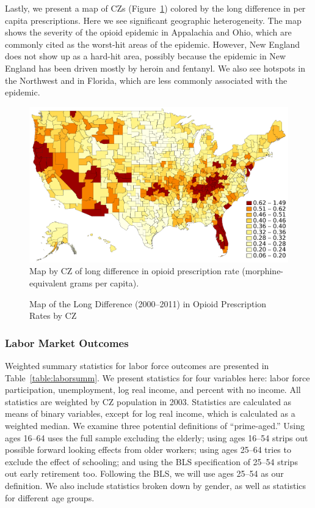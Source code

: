 \documentclass[12pt]{article}
\begin{document}
Lastly, we present a map of CZs (Figure~\ref{figure:opioidmap}) colored by the long difference in per capita prescriptions.  Here we see significant geographic heterogeneity.  The map shows the severity of the opioid epidemic in Appalachia and Ohio, which are commonly cited as the worst-hit areas of the epidemic.  However, New England does not show up as a hard-hit area, possibly because the epidemic in New England has been driven mostly by heroin and fentanyl.  We also see hotspots in the Northwest and in Florida, which are less commonly associated with the epidemic.

\begin{figure}[htbp]
    \centering
    \caption{Map of the Long Difference (2000--2011) in Opioid Prescription Rates by CZ}
    \begin{minipage}{\textwidth}
        \includegraphics[width=\textwidth]{figs/map_opioiddiff.pdf}
    \footnotesize
    Map by CZ of long difference in opioid prescription rate (morphine-equivalent grams per capita).
    \end{minipage}
    \label{figure:opioidmap}
\end{figure}

\subsubsection{Labor Market Outcomes}
Weighted summary statistics for labor force outcomes are presented in Table~\ref{table:laborsumm}.  We present statistics for four variables here: labor force participation, unemployment, log real income, and percent with no income.  All statistics are weighted by CZ population in 2003.  Statistics are calculated as means of binary variables, except for log real income, which is calculated as a weighted median.  We examine three potential definitions of ``prime-aged.''  Using ages 16--64 uses the full sample excluding the elderly; using ages 16--54 strips out possible forward looking effects from older workers; using ages 25--64 tries to exclude the effect of schooling; and using the BLS specification of 25--54 strips out early retirement too.  Following the BLS, we will use ages 25--54 as our definition.  We also include statistics broken down by gender, as well as statistics for different age groups.
\end{document}
